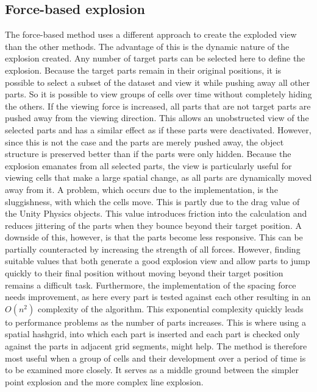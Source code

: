 \subsection{Force-based explosion}
The force-based method uses a different approach to create the exploded view than the other methods. The advantage of this is the dynamic nature of the explosion created. Any number of target parts can be selected here to define the explosion. Because the target parts remain in their original positions, it is possible to select a subset of the dataset and view it while pushing away all other parts. So it is possible to view groups of cells over time without completely hiding the others. If the viewing force is increased, all parts that are not target parts are pushed away from the viewing direction. This allows an unobstructed view of the selected parts and has a similar effect as if these parts were deactivated. However, since this is not the case and the parts are merely pushed away, the object structure is preserved better than if the parts were only hidden. Because the explosion emanates from all selected parts, the view is particularly useful for viewing cells that make a large spatial change, as all parts are dynamically moved away from it. A problem, which occurs due to the implementation, is the sluggishness, with which the cells move. This is partly due to the drag value of the Unity Physics objects. This value introduces friction into the calculation and reduces jittering of the parts when they bounce beyond their target position. A downside of this, however, is that the parts become less responsive. This can be partially counteracted by increasing the strength of all forces. However, finding suitable values that both generate a good explosion view and allow parts to jump quickly to their final position without moving beyond their target position remains a difficult task. Furthermore, the implementation of the spacing force needs improvement, as here every part is tested against each other resulting in an $O(n^2)$ complexity of the algorithm. This exponential complexity quickly leads to performance problems as the number of parts increases. This is where using a spatial hashgrid, into which each part is inserted and each part is checked only against the parts in adjacent grid segments, might help. The method is therefore most useful when a group of cells and their development over a period of time is to be examined more closely. It serves as a middle ground between the simpler point explosion and the more complex line explosion.


